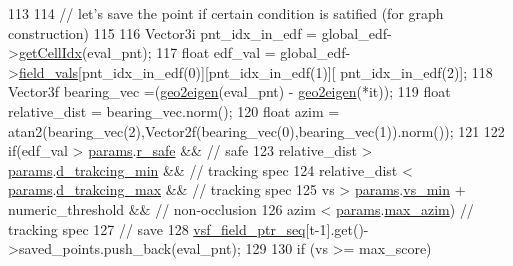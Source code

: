 \begin{DoxyCode}
113 
114                     \textcolor{comment}{// let's save the point if certain condition is satified (for graph construction)      
                }
115                     
116                     Vector3i pnt\_idx\_in\_edf = global\_edf->\hyperlink{struct_grid_field_a1a70c2de6239c1b086d01dc89b161b7c}{getCellIdx}(eval\_pnt);
117                     \textcolor{keywordtype}{float} edf\_val = global\_edf->\hyperlink{struct_grid_field_a46802a85d9533d4371d12597f0247c7d}{field\_vals}[pnt\_idx\_in\_edf(0)][pnt\_idx\_in\_edf(1)][
      pnt\_idx\_in\_edf(2)];  
118                     Vector3f bearing\_vec =(\hyperlink{_common_8h_a3e35de4eb7396984c2c5018768885d91}{geo2eigen}(eval\_pnt) - 
      \hyperlink{_common_8h_a3e35de4eb7396984c2c5018768885d91}{geo2eigen}(*it)); 
119                     \textcolor{keywordtype}{float} relative\_dist = bearing\_vec.norm();                      
120                     \textcolor{keywordtype}{float} azim = atan2(bearing\_vec(2),Vector2f(bearing\_vec(0),bearing\_vec(1)).norm());
121                     
122                     \textcolor{keywordflow}{if}(edf\_val > \hyperlink{class_preplanner_a679cc4b70f041aff73769e7ec92dc5d0}{params}.\hyperlink{structchaser_1_1_preplanner_params_a409be3b01b1b4853919d5b34e529c49a}{r\_safe} && \textcolor{comment}{// safe }
123                         relative\_dist > \hyperlink{class_preplanner_a679cc4b70f041aff73769e7ec92dc5d0}{params}.\hyperlink{structchaser_1_1_preplanner_params_aeef51c9ac61b5fa70c853463a27ff879}{d\_trakcing\_min} && \textcolor{comment}{// tracking spec}
124                         relative\_dist < \hyperlink{class_preplanner_a679cc4b70f041aff73769e7ec92dc5d0}{params}.\hyperlink{structchaser_1_1_preplanner_params_ad6659842d3039da7b064532a090651d3}{d\_trakcing\_max} && \textcolor{comment}{// tracking spec}
125                         vs > \hyperlink{class_preplanner_a679cc4b70f041aff73769e7ec92dc5d0}{params}.\hyperlink{structchaser_1_1_preplanner_params_a2abe7915546a5d2ebde667a1d5ccfb44}{vs\_min} + numeric\_threshold  && \textcolor{comment}{// non-occlusion}
126                         azim < \hyperlink{class_preplanner_a679cc4b70f041aff73769e7ec92dc5d0}{params}.\hyperlink{structchaser_1_1_preplanner_params_ab357e30646928070cd553ccf14be0beb}{max\_azim})  \textcolor{comment}{// tracking spec }
127                         \textcolor{comment}{// save}
128                         \hyperlink{class_preplanner_aab0f91e34b86eaa581c7642ba5059308}{vsf\_field\_ptr\_seq}[t-1].get()->saved\_points.push\_back(eval\_pnt);
129                     
130                     \textcolor{keywordflow}{if} (vs >= max\_score)

\end{DoxyCode}
